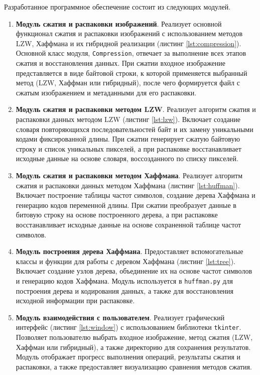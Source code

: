 Разработанное программное обеспечение состоит из следующих модулей.
\begin{enumerate}
    \item \textbf{Модуль сжатия и распаковки изображений}. Реализует основной функционал сжатия и распаковки изображений с использованием методов LZW, Хаффмана и их гибридной реализации (листинг \ref{lst:compression}). Основной класс модуля, \texttt{Compression}, отвечает за выполнение всех этапов сжатия и восстановления данных. При сжатии входное изображение представляется в виде байтовой строки, к которой применяется выбранный метод (LZW, Хаффман или гибридный), после чего формируется файл с сжатым изображением и метаданными для его распаковки.
    \item \textbf{Модуль сжатия и распаковки методом LZW}. Реализует алгоритм сжатия и распаковки данных методом LZW (листинг \ref{lst:lzw}). Включает создание словаря повторяющихся последовательностей байт и их замену уникальными кодами фиксированной длины. При сжатии генерирует сжатую байтовую строку и список уникальных пикселей, а при распаковке восстанавливает исходные данные на основе словаря, воссозданного по списку пикселей.
    \item \textbf{Модуль сжатия и распаковки методом Хаффмана}. Реализует алгоритм сжатия и распаковки данных методом Хаффмана (листинг \ref{lst:huffman}). Включает построение таблицы частот символов, создание дерева Хаффмана и генерацию кодов переменной длины. При сжатии преобразует данные в битовую строку на основе построенного дерева, а при распаковке восстанавливает исходные данные на основе сохраненной таблице частот символов.
    \item \textbf{Модуль построения дерева Хаффмана}. Предоставляет вспомогательные классы и функции для работы с деревом Хаффмана (листинг \ref{lst:tree}). Включает создание узлов дерева, объединение их на основе частот символов и генерацию кодов Хаффмана. Модуль используется в \texttt{huffman.py} для построения дерева и кодирования данных, а также для восстановления исходной информации при распаковке.
    \item \textbf{Модуль взаимодействия с пользователем}. Реализует графический интерфейс (листинг \ref{lst:window}) с использованием библиотеки \texttt{tkinter}. Позволяет пользователю выбрать входное изображение, метод сжатия (LZW, Хаффман или гибридный), а также директорию для сохранения результатов. Модуль отображает прогресс выполнения операций, результаты сжатия и распаковки, а также предоставляет визуализацию сравнения методов сжатия.
\end{enumerate}

